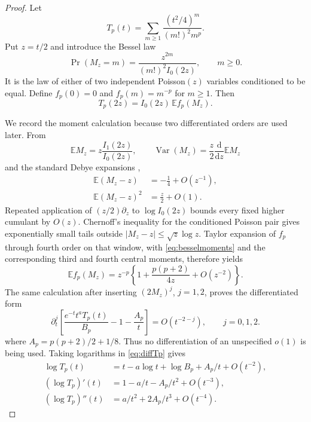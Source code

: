 \documentclass[11pt]{article}
\newcommand{\E}{\mathbb E}
\newcommand{\dd}{\mathrm d}
\begin{document}
\begin{proof}
Let
\[
 T_p(t)=\sum_{m\ge1}\frac{(t^2/4)^m}{(m!)^2m^p}.
\]
Put $z=t/2$ and introduce the Bessel law
\[
 \Pr(M_z=m)=\frac{z^{2m}}{(m!)^2I_0(2z)},\qquad m\ge0.
\]
It is the law of either of two independent Poisson$(z)$ variables
conditioned to be equal.  Define $f_p(0)=0$ and $f_p(m)=m^{-p}$ for
$m\ge1$.  Then
\begin{equation}
 T_p(2z)=I_0(2z)\,\E f_p(M_z).                          \label{eq:bessellaw}
\end{equation}

We record the moment calculation because two differentiated orders are used
later.  From
\[
 \E M_z=z\frac{I_1(2z)}{I_0(2z)},\qquad
 \operatorname{Var}(M_z)=\frac z2\frac{\dd}{\dd z}\E M_z
\]
and the standard Debye expansions \cite{DLMF,Olver1997},
\begin{align}
 \E(M_z-z)&=-\frac14+O(z^{-1}),\nonumber\\
 \E(M_z-z)^2&=\frac z2+O(1).                            \label{eq:besselmoments}
\end{align}
Repeated application of $(z/2)\partial_z$ to $\log I_0(2z)$ bounds every
fixed higher cumulant by $O(z)$.  Chernoff's inequality for the conditioned
Poisson pair gives exponentially small tails outside
$|M_z-z|\le\sqrt z\log z$.  Taylor expansion of $f_p$ through fourth order
on that window, with \cref{eq:besselmoments} and the corresponding third and fourth
central moments, therefore yields
\begin{equation}
 \E f_p(M_z)
 =z^{-p}\left\{1+\frac{p(p+2)}{4z}+O(z^{-2})\right\}.  \label{eq:fpmean}
\end{equation}
The same calculation after inserting $(2M_z)^j$, $j=1,2$, proves the
differentiated form
\begin{equation}
 \partial_t^j\!\left[
 \frac{e^{-t}t^aT_p(t)}{B_p}
 -1-\frac{A_p}{t}\right]=O(t^{-2-j}),\qquad j=0,1,2.  \label{eq:diffTp}
\end{equation}
where $A_p=p(p+2)/2+1/8$.  Thus no differentiation of an unspecified
$o(1)$ is being used.  Taking logarithms in \cref{eq:diffTp} gives
\begin{align}
 \log T_p(t)&=t-a\log t+\log B_p+A_p/t+O(t^{-2}),\nonumber\\
 (\log T_p)'(t)&=1-a/t-A_p/t^2+O(t^{-3}),\nonumber\\
 (\log T_p)''(t)&=a/t^2+2A_p/t^3+O(t^{-4}).             \label{eq:logTp}
\end{align}


\end{proof}
\end{document}
